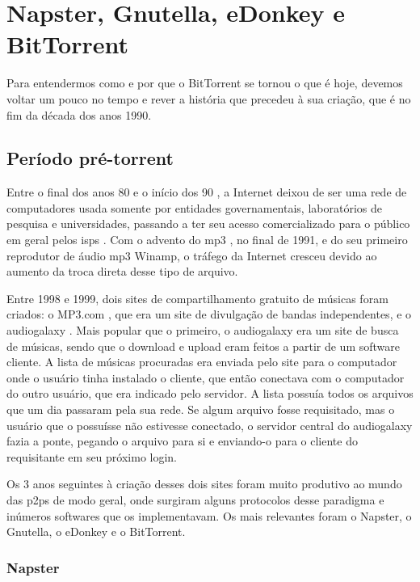 
\chapter{Napster, Gnutella, eDonkey e BitTorrent}

Para entendermos como e por que o BitTorrent se tornou o que é hoje, devemos voltar um
pouco no tempo e rever a história que precedeu à sua criação, que é no fim da década dos
anos 1990.

\section{Período pré-torrent}

Entre o final dos anos 80 e o início dos 90 \cite{wiki:fs,wiki:fs-timeline}, a
Internet deixou de ser uma rede de computadores usada somente por entidades
governamentais, laboratórios de pesquisa e universidades, passando a ter seu acesso
comercializado para o público em geral pelos \glspl{isp} \cite{wiki:isp}. Com o
advento do \gls{mp3} \cite{wiki:mp3}, no final de 1991, e do seu primeiro reprodutor
de áudio \gls*{mp3} Winamp, o tráfego da Internet cresceu devido ao aumento da troca
direta desse tipo de arquivo.

Entre 1998 e 1999, dois sites de compartilhamento gratuito de músicas foram criados: o
MP3.com \cite{wiki:mp3.com}, que era um site de divulgação de bandas independentes,
e o \gls{audiogalaxy} \cite{wiki:audiogalaxy.com,revista:pnp}. Mais popular que o
primeiro, o \gls*{audiogalaxy} era um site de busca de músicas, sendo que o download e
upload eram feitos a partir de um software cliente. A lista de músicas procuradas era
enviada pelo site para o computador onde o usuário tinha instalado o cliente, que então
conectava com o computador do outro usuário, que era indicado pelo servidor. A lista
possuía todos os arquivos que um dia passaram pela sua rede. Se algum arquivo fosse
requisitado, mas o usuário que o possuísse não estivesse conectado, o servidor central
do \gls*{audiogalaxy} fazia a ponte, pegando o arquivo para si e enviando-o para o
cliente do requisitante em seu próximo login.

Os 3 anos seguintes à criação desses dois sites foram muito produtivo ao mundo das
\glspl{p2p} de modo geral, onde surgiram alguns protocolos desse paradigma e inúmeros
softwares que os implementavam. Os mais relevantes foram o Napster, o Gnutella, o
eDonkey e o BitTorrent.

\subsection{Napster}

